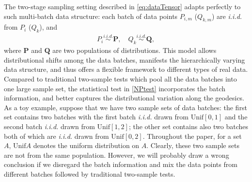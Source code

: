 \documentclass{imsart}
\numberwithin{equation}{section}
\begin{document}
The two-stage sampling setting described in \eqref{eq:dataTensor} adapts perfectly to such multi-batch data structure: each batch of data points $P_{i,m}$ ($Q_{k, m}$) are \textit{i.i.d.} from $P_i$ ($Q_k$), and 
\begin{align*}
	P_i \stackrel{\textit{i.i.d.}}{\sim} \mathbf{P},\quad Q_k \stackrel{\textit{i.i.d.}}{\sim} \mathbf{Q},
\end{align*}
where $\mathbf{P}$ and $\mathbf{Q}$ are two populations of distributions. 
This model allows distributional shifts among the data batches, manifests the hierarchically varying data structure, and thus offers a flexible framework to different types of real data. 
Compared to traditional two-sample tests which pool all the data batches into one large sample set, the statistical test in \eqref{NPtest} incorporates the batch information, and better captures the distributional variation along the geodesics. As a toy example, suppose that we have two sample sets of data batches: the first set contains two batches with the first batch \textit{i.i.d.} drawn from $\text{Unif}[0,1]$ and the second batch \textit{i.i.d.} drawn from $\text{Unif}[1,2]$; the other set contains also two batches both of which are \textit{i.i.d.} drawn from $\text{Unif}[0,2]$. 
Throughout the paper, for a set $A$, $\text{Unif} A$ denotes the uniform distribution on $A$. 
Clearly, these two sample sets are not from the same population. However, we will probably draw a wrong conclusion if we disregard the batch information and mix the data points from different batches followed by traditional two-sample tests. 

\end{document}
